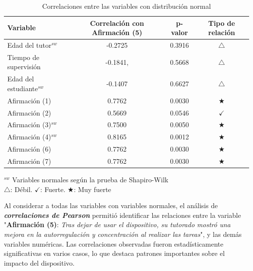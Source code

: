 \documentclass[a4paper,fleqn]{cas-sc}
\begin{document}
				\begin{table}[h!]
					\centering
					\caption{Correlaciones entre las variables con distribución normal}
					\begin{tabularx}{0.75\textwidth}{Xccc}
						\toprule
						\textbf{Variable} & \textbf{Correlación con Afirmación (5)} &  \textbf{p-valor} & \textbf{Tipo de relación} \\
						\midrule
						Edad del tutor$^{sw}$ & -0.2725 & 0.3916 & \(\bigtriangleup\) \\ %
						Tiempo de supervisión & -0.1841, & 0.5668 & \(\bigtriangleup\) \\ %
						Edad del estudiante$^{sw}$ & -0.1407 & 0.6627 & \(\bigtriangleup\) \\ %
						Afirmación (1) & 0.7762 & 0.0030 & \(\bigstar\) \\ %
						Afirmación (2) & 0.5669 & 0.0546 & \(\checkmark\) \\ %
						Afirmación (3)$^{sw}$ & 0.7500 & 0.0050 & \(\bigstar\) \\ %
						Afirmación (4)$^{sw}$ & 0.8165 & 0.0012 & \(\bigstar\) \\ %
						Afirmación (6) & 0.7762 & 0.0030 & \(\bigstar\) \\ %
						Afirmación (7) & 0.7762 & 0.0030 & \(\bigstar\) \\ %
						\bottomrule
					\end{tabularx}
					\label{table:Pearson-Correlation}
					\vspace{0.3em} %
					\parbox{0.75\textwidth}{\footnotesize
						$^{sw}$ Variables normales según la prueba de Shapiro-Wilk\\
						\(\bigtriangleup\): Débil. \(\checkmark\): Fuerte. \(\bigstar\): Muy fuerte
					}
				\end{table}
				
				Al considerar a todas las variables con variables normales, el análisis de \textit{\textbf{correlaciones de Pearson}} permitió identificar las relaciones entre la variable "\textbf{Afirmación (5)}: \textit{Tras dejar de usar el dispositivo, su tutorado mostró una mejora en la autorregulación y concentración al realizar las tareas}", y las demás variables numéricas. Las correlaciones observadas fueron estadísticamente significativas en varios casos, lo que destaca patrones importantes sobre el impacto del dispositivo.
				
\end{document}
